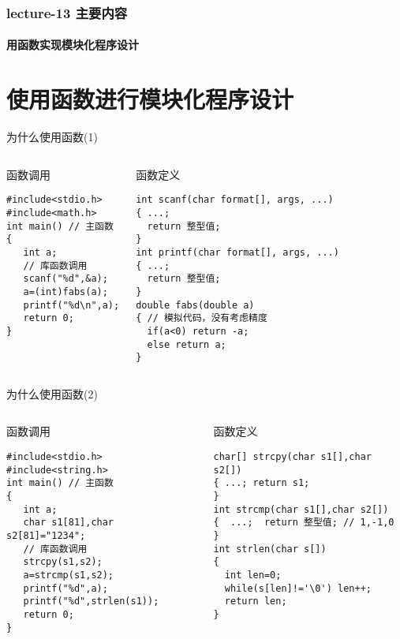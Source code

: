\begin{frame}[shrink]
  \frametitle{lecture-13 主要内容}
  \framesubtitle{用函数实现模块化程序设计}
  \tableofcontents
\end{frame}

\section{使用函数进行模块化程序设计}

\begin{frame}{为什么使用函数(1)}
\tiny
\begin{columns}[T]
\begin{beamerboxesrounded}{函数调用}
\begin{lstlisting}
#include<stdio.h>
#include<math.h>
int main() // 主函数
{
   int a;
   // 库函数调用
   scanf("%d",&a); 
   a=(int)fabs(a); 
   printf("%d\n",a);
   return 0; 
}
\end{lstlisting}
\end{beamerboxesrounded}
\begin{beamerboxesrounded}{函数定义}
\begin{lstlisting}
int scanf(char format[], args, ...)
{ ...;
  return 整型值;
}
int printf(char format[], args, ...)
{ ...;
  return 整型值;
}
double fabs(double a)
{ // 模拟代码，没有考虑精度
  if(a<0) return -a;
  else return a;
}
\end{lstlisting}
\end{beamerboxesrounded}
\end{columns}
\end{frame}

\begin{frame}{为什么使用函数(2)}
\tiny
\begin{columns}[T]
\begin{beamerboxesrounded}{函数调用}
\begin{lstlisting}
#include<stdio.h>
#include<string.h>
int main() // 主函数
{
   int a;
   char s1[81],char s2[81]="1234";
   // 库函数调用 
   strcpy(s1,s2); 
   a=strcmp(s1,s2);
   printf("%d",a);
   printf("%d",strlen(s1));
   return 0; 
}
\end{lstlisting}
\end{beamerboxesrounded}
\begin{beamerboxesrounded}{函数定义}
\begin{lstlisting}
char[] strcpy(char s1[],char s2[])
{ ...; return s1; 
}
int strcmp(char s1[],char s2[])
{  ...;  return 整型值; // 1,-1,0
}
int strlen(char s[])
{
  int len=0;
  while(s[len]!='\0') len++;
  return len;
}
\end{lstlisting}
\end{beamerboxesrounded}
\end{columns}
\end{frame}

